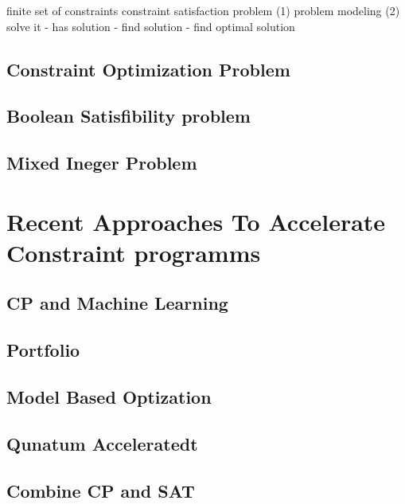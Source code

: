 \label{sec:Grundlagen}
finite set of constraints \cite[1]{aptjo} constraint satisfaction problem
\cite[1]{aptjo} (1) problem modeling (2) solve it - has solution - find solution
- find optimal solution
\cite*[postnote]{aptjo}


\subsection{Constraint Optimization Problem}
\label{sec: Constraint Optimization Problem}


\subsection{Boolean Satisfibility problem}
\label{sec: Boolean Satisfibility problem}


\subsection{Mixed Ineger Problem}
\label{sec: Mixed Ineger Problem}


\section{Recent Approaches To Accelerate Constraint programms}
\label{sec:Recent Approaches To Accelerate Constraint programms}


\subsection{CP and Machine Learning}
\label{sec:CP and Machine Learning}

  
\subsection{Portfolio}
\label{sec:Portfolio}

  
\subsection{Model Based Optization}
\label{sec:Model Based Optization}

  
\subsection{Qunatum Acceleratedt}
\label{sec:Qunatum Accelerated}

  
\subsection{Combine CP and SAT}
\label{sec:Combine CP and SAT}

